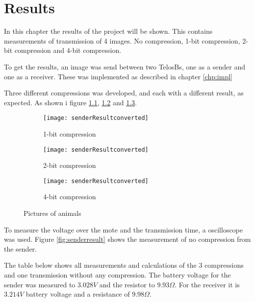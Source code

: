 \chapter{Results}
\label{chp:results}

In this chapter the results of the project will be shown. This contains measurements of transmission of 4 images. No compression, 1-bit compression, 2-bit compression and 4-bit compression.

To get the results, an image was send between two TelosBs, one as a sender and one as a receiver. These was implemented as described in chapter \ref{chp:impl}

Three different compressions was developed, and each with a different result, as expected. As shown i figure \ref{fig:one}, \ref{fig:two} and \ref{fig:four}.

\begin{figure}[h]
	\centering
	\begin{subfigure}{0.3\textwidth}
		\texttt{[image: senderResultconverted]}
		\caption{1-bit compression}
		\label{fig:one}
	\end{subfigure}
	\begin{subfigure}{0.3\textwidth}
		\texttt{[image: senderResultconverted]}
		\caption{2-bit compression}
		\label{fig:two}
	\end{subfigure}
	\begin{subfigure}{0.3\textwidth}
		\texttt{[image: senderResultconverted]}
		\caption{4-bit compression}
		\label{fig:four}
	\end{subfigure}
	\caption{Pictures of animals}\label{fig:animals}
\end{figure}


To measure the voltage over the mote and the transmission time, a oscilloscope was used. Figure \ref{fig:senderresult} shows the measurement of no compression from the sender. 



The table below shows all measurements and calculations of the 3 compressions and one transmission without any compression. The battery voltage for the sender was measured to $3.028V$ and the resistor to $9.93\Omega$. For the receiver it is $3.214V$ battery voltage and a resistance of $9.98\Omega$.

